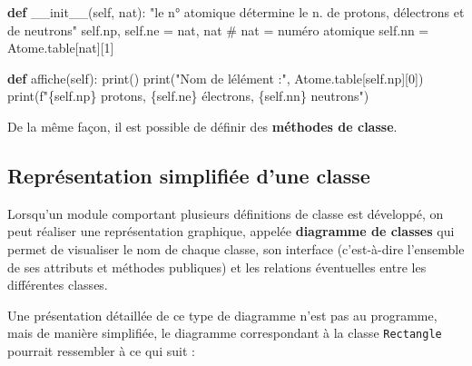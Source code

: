 \documentclass[
  french,
  letterpaper,
  DIV=11,
  numbers=noendperiod]{scrartcl}
\newenvironment{Shaded}{\begin{snugshade}}{\end{snugshade}}
\newcommand{\BuiltInTok}[1]{\textcolor[rgb]{0.00,0.23,0.31}{#1}}
\newcommand{\CommentTok}[1]{\textcolor[rgb]{0.37,0.37,0.37}{#1}}
\newcommand{\DecValTok}[1]{\textcolor[rgb]{0.68,0.00,0.00}{#1}}
\newcommand{\FunctionTok}[1]{\textcolor[rgb]{0.28,0.35,0.67}{#1}}
\newcommand{\KeywordTok}[1]{\textcolor[rgb]{0.00,0.23,0.31}{\textbf{#1}}}
\newcommand{\NormalTok}[1]{\textcolor[rgb]{0.00,0.23,0.31}{#1}}
\newcommand{\OperatorTok}[1]{\textcolor[rgb]{0.37,0.37,0.37}{#1}}
\newcommand{\SpecialCharTok}[1]{\textcolor[rgb]{0.37,0.37,0.37}{#1}}
\newcommand{\SpecialStringTok}[1]{\textcolor[rgb]{0.13,0.47,0.30}{#1}}
\newcommand{\StringTok}[1]{\textcolor[rgb]{0.13,0.47,0.30}{#1}}
\newcommand{\VariableTok}[1]{\textcolor[rgb]{0.07,0.07,0.07}{#1}}
\begin{document}
\begin{tcolorbox}
\begin{Shaded}
\begin{Highlighting}[]
\KeywordTok{def} \FunctionTok{\_\_init\_\_}\NormalTok{(}\VariableTok{self}\NormalTok{, nat):}
    \CommentTok{"le n° atomique détermine le n. de protons, d\textquotesingle{}électrons et de neutrons"}
    \VariableTok{self}\NormalTok{.np, }\VariableTok{self}\NormalTok{.ne }\OperatorTok{=}\NormalTok{ nat, nat  }\CommentTok{\# nat = numéro atomique}
    \VariableTok{self}\NormalTok{.nn }\OperatorTok{=}\NormalTok{ Atome.table[nat][}\DecValTok{1}\NormalTok{]}

\KeywordTok{def}\NormalTok{ affiche(}\VariableTok{self}\NormalTok{):}
    \BuiltInTok{print}\NormalTok{()}
    \BuiltInTok{print}\NormalTok{(}\StringTok{"Nom de l\textquotesingle{}élément :"}\NormalTok{, Atome.table[}\VariableTok{self}\NormalTok{.np][}\DecValTok{0}\NormalTok{])}
    \BuiltInTok{print}\NormalTok{(}\SpecialStringTok{f"}\SpecialCharTok{\{}\VariableTok{self}\SpecialCharTok{.}\NormalTok{np}\SpecialCharTok{\}}\SpecialStringTok{ protons, }\SpecialCharTok{\{}\VariableTok{self}\SpecialCharTok{.}\NormalTok{ne}\SpecialCharTok{\}}\SpecialStringTok{ électrons, }\SpecialCharTok{\{}\VariableTok{self}\SpecialCharTok{.}\NormalTok{nn}\SpecialCharTok{\}}\SpecialStringTok{ neutrons"}\NormalTok{)}
\end{Highlighting}
\end{Shaded}

De la même façon, il est possible de définir des \textbf{méthodes de
classe}.

\end{tcolorbox}

\subsection{Représentation simplifiée d'une
classe}\label{repruxe9sentation-simplifiuxe9e-dune-classe}

Lorsqu'un module comportant plusieurs définitions de classe est
développé, on peut réaliser une représentation graphique, appelée
\textbf{diagramme de classes} qui permet de visualiser le nom de chaque
classe, son interface (c'est-à-dire l'ensemble de ses attributs et
méthodes publiques) et les relations éventuelles entre les différentes
classes.

Une présentation détaillée de ce type de diagramme n'est pas au
programme, mais de manière simplifiée, le diagramme correspondant à la
classe \texttt{Rectangle} pourrait ressembler à ce qui suit :
\end{document}
